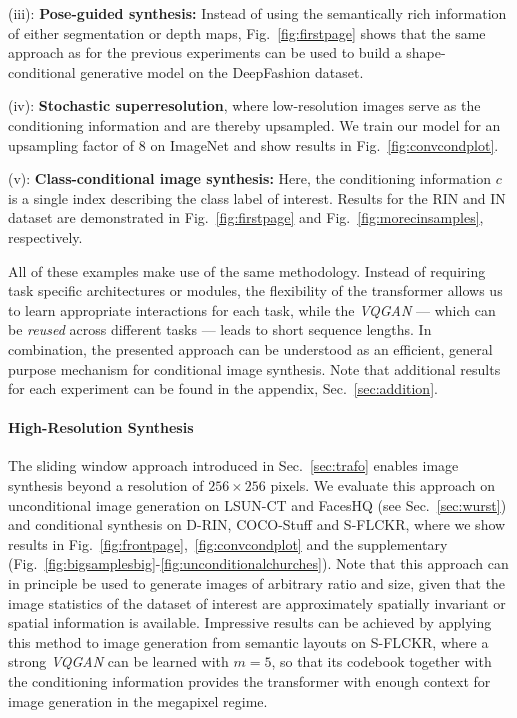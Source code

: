 \documentclass[final]{cvpr}
\begin{document}
\noindent (iii): \textbf{Pose-guided synthesis:} Instead of using the semantically
rich information of either segmentation or depth maps, Fig.~\ref{fig:firstpage}
shows that the same approach as for the previous experiments can be used to
build a shape-conditional generative model on the DeepFashion
\cite{liuLQWTcvpr16DeepFashion} dataset.

\enlargethispage{1\baselineskip}
\noindent (iv): \textbf{Stochastic superresolution}, where low-resolution images
serve as the conditioning information and are thereby upsampled. We train our model for an 
upsampling factor of 8 on ImageNet and show results in
Fig.~\ref{fig:convcondplot}. 

\noindent (v): \textbf{Class-conditional image synthesis:} Here, the conditioning
information $c$ is a single index describing the class label of interest.
Results for the RIN and IN dataset are
demonstrated in Fig.~\ref{fig:firstpage} and Fig.~\ref{fig:morecinsamples}, respectively. %

\noindent All of these examples make use of the same methodology. Instead of requiring
task specific architectures or modules, the flexibility of the transformer
allows us to learn appropriate interactions for each task, while the
\emph{VQGAN} --- which can be \emph{reused}
across different tasks --- leads to short sequence lengths. In combination, the
presented approach can be understood as an efficient, general purpose mechanism
for conditional image synthesis. Note that additional results for each experiment can be found in the appendix, Sec.~\ref{sec:addition}.
%
\paragraph{High-Resolution Synthesis} The sliding window approach introduced in Sec.~\ref{sec:trafo}
enables image synthesis beyond a resolution of $256 \times 256$ pixels.
%
We evaluate this approach on unconditional image generation on LSUN-CT and
FacesHQ (see Sec.~\ref{sec:wurst}) and  conditional synthesis on D-RIN,
COCO-Stuff and S-FLCKR, where we show results in
Fig.~\ref{fig:frontpage},~\ref{fig:convcondplot} and the supplementary (Fig.~\ref{fig:bigsamplesbig}-\ref{fig:unconditionalchurches}). Note that this approach can in principle be used to generate images of arbitrary ratio and size, given that the image statistics of the dataset of interest are approximately spatially invariant or spatial information is available. 
Impressive results can be achieved by applying this method to image generation from semantic layouts on S-FLCKR, where a strong \emph{VQGAN} can be learned with $m=5$, so that its codebook together with the conditioning information provides the transformer with enough context for image generation in the megapixel regime. 
\bigsamples
\convcondplot
%
\enlargethispage{1\baselineskip}
\end{document}
